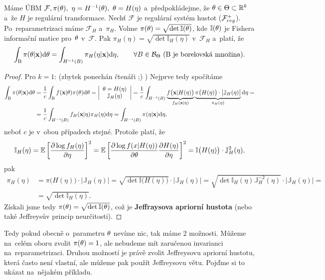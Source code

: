 \begin{theorem}[Jeffreys]
	Máme ÚBM $\mathcal{F},\pi(\theta),~\eta=H^{-1}(\theta),~\theta=H(\eta)$ a~předpokládejme, že $\theta\in\Theta\subset\mathbb{R}^k$ a~že $H$ je regulární transformace. Nechť $\mathcal{F}$ je regulární systém hustot ($\mathcal{F}_{reg}^+$). Po~reparametrizaci máme $\mathcal{F}_H$ a~$\pi_H$. Volme $\pi(\theta)=\sqrt{\det \mathbb{I}(\theta)}$, kde $\mathbb{I}(\theta)$ je Fishera informační matice pro~$\theta$ v~$\mathcal{F}$. Pak $\pi_H(\eta)=\sqrt{\det \mathbb{I}_H(\eta)}$ v~$\mathcal{F}_H$ a~platí, že 
	$$ \int_\mathrm{B}\pi(\theta|\textbf{x})\mathrm{d}\theta=\int_{H^{-1}(B)}\pi_H(\eta|\textbf{x})\mathrm{d}\eta,\qquad\forall B\in\mathcal{B}_\Theta \text{ (B je borelovská množina).}$$
	\begin{proof}
		Pro $k=1$: (zbytek ponechán čtenáři ;) ) Nejprve tedy spočítáme
		\[
		\begin{split}
		\int_\mathrm{B}\pi(\theta|\textbf{x})\mathrm{d}\theta&=\frac{1}{c}\int_\mathrm{B} f(\textbf{x}|\theta)\pi(\theta)\mathrm{d}\theta=\left|\begin{array}{c}
		\theta=H(\eta)\\\mathbb{J}_H(\eta)
		\end{array}
		\right|=\frac{1}{c}\int_{H^{-1}(B)}\underbrace{f\big(\textbf{x}|H(\eta)\big)}_{f_H(\textbf{x}|\eta)}\underbrace{\pi\big(H(\eta)\big)\cdot\big|\mathbb{J}_H(\eta)\big|}_{\pi_H(\eta)}\mathrm{d}\eta=\\&=\frac{1}{c}\int_{H^{-1}(B)}f_H(\textbf{x}|\eta)\pi_H(\eta)\mathrm{d}\eta=\int_{H^{-1}(B)}\pi(\eta|\textbf{x})\mathrm{d}\eta,
		\end{split}
		\]
		neboť $c$ je v~obou případech stejné. Protože platí, že
		$$ \mathbb{I}_H(\eta)=\mathbb{E}\left[ \frac{\partial\log f_H(\eta)}{\partial\eta} \right]^2=\mathbb{E}\left[ \frac{\partial\log f(x|H(\eta))}{\partial\theta}\frac{\partial H(\eta)}{\partial\eta} \right]^2=\mathbb{I}\big(H(\eta)\big) \cdot \mathbb{J}_H^2(\eta) ,$$
		pak \[
		\begin{split}
		\pi_H(\eta)&=\pi\big(H(\eta)\big)\cdot\big|\mathbb{J}_H(\eta)\big|=\sqrt{\det \mathbb{I}\big(H(\eta)\big)}\cdot\big|\mathbb{J}_H(\eta)\big|=\sqrt{\det \mathbb{I}_H(\eta)\mathbb{J}_H^{-2}(\eta)}\cdot\big|\mathbb{J}_H(\eta)\big|=\\&=\sqrt{\det \mathbb{I}_H(\eta)}.
		\end{split}
		\]
		Získali jsme tedy $\pi(\theta)=\sqrt{\det \mathbb{I}(\theta)}$, což je \textbf{Jeffraysova apriorní hustota} (nebo také Jeffreysův princip neurčitosti).
	\end{proof}
\end{theorem}
Tedy pokud obecně o~parametru $\theta$ nevíme nic, tak máme 2 možnosti. Můžeme na~celém oboru zvolit $\pi(\theta)=1$, ale nebudeme mít zaručenou invarianci na~reparametrizaci. Druhou možností je právě zvolit Jeffreysovu apriorní hustotu, která často není vlastní, ale můžeme pak použít Jeffreysovu větu. Pojďme si to ukázat na~nějakém příkladu.
